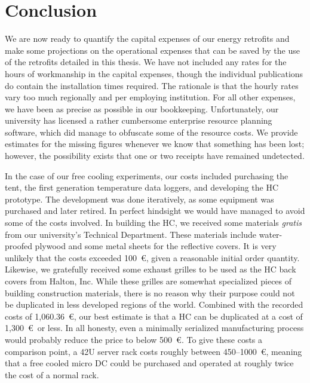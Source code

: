 \documentclass[officiallayout]{tktla}
\begin{document}
\chapter{Conclusion}
\label{ch:conclusion}

We are now ready to quantify the capital expenses of our energy retrofits and
make some projections on the operational expenses that can be saved by the use
of the retrofits detailed in this thesis. We have not included any rates for
the hours of workmanship in the capital expenses, though the individual
publications do contain the installation times required. The rationale is that
the hourly rates vary too much regionally and per employing institution. For
all other expenses, we have been as precise as possible in our bookkeeping.
Unfortunately, our university has licensed a rather cumbersome enterprise
resource planning software, which did manage to obfuscate some of the resource
costs. We provide estimates for the missing figures whenever we know that
something has been lost; however, the possibility exists that one or two
receipts have remained undetected. 

In the case of our free cooling experiments, our costs included purchasing the
tent, the first generation temperature data loggers, and developing the HC
prototype. The development was done iteratively, as some equipment was
purchased and later retired. In perfect hindsight we would have managed to
avoid some of the costs involved. In building the HC, we received some
materials \emph{gratis} from our university's Technical Department. These
materials include water-proofed plywood and some metal sheets for the
reflective covers. It is very unlikely that the costs exceeded 100~\euro,
given a reasonable initial order quantity. Likewise, we gratefully received
some exhaust grilles to be used as the HC back covers from Halton, Inc. While
these grilles are somewhat specialized pieces of building construction
materials, there is no reason why their purpose could not be duplicated in
less developed regions of the world. Combined with the recorded costs of
1,060.36~\euro, our best estimate is that a HC can be duplicated at a cost of
1,300~\euro\ or less. In all honesty, even a minimally serialized
manufacturing process would probably reduce the price to below 500~\euro. To
give these costs a comparison point, a 42U server rack costs roughly between
450--1000~\euro, meaning that a free cooled micro DC could be purchased and
operated at roughly twice the cost of a normal rack.
\end{document}
